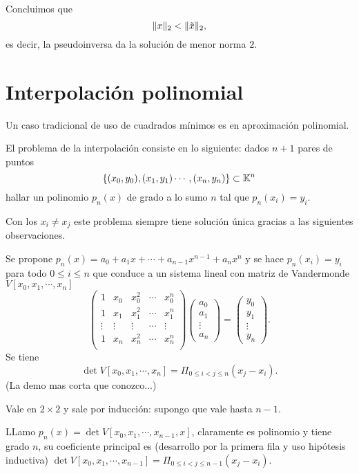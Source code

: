Concluimos que
$$
\|\xb\|_2<\|\tilde\xb\|_2,
$$
es decir, la pseudoinversa da la solución de menor norma $2$.



\section{Interpolación polinomial}
Un caso tradicional de uso de cuadrados mínimos es en aproximación polinomial.

El problema de la interpolación consiste en lo siguiente: dados $n+1$ pares de puntos
$$\{(x_{0},y_{0}),(x_{1},y_{1})\cdots ,(x_{n},y_{n})\}\subset \mathbb K^{n}$$
hallar un polinomio $p_{n}(x)$ de grado a lo sumo $n$ tal que $p_{n}(x_{i})=y_{i}$.


Con los $x_{i}\neq x_{j}$ este problema siempre tiene solución única gracias a las siguientes observaciones.



 Se propone $p_{n}(x)=a_{0}+ a_{1}x+\cdots +a_{n-1}x^{n-1} +a_{n}x^{n}$ y se hace $p_{n}(x_{i})=y_{i}$ para todo $0\le i\le n$ que conduce a un sistema lineal con matriz de Vandermonde $V[x_0,x_1,\cdots,x_n]$
 $$
 \begin{pmatrix}
 1&x_{0}&x_{0}^{2}&\cdots &x_{0}^{n}\\
 1&x_{1}&x_{1}^{2}&\cdots &x_{1}^{n}\\
 \vdots&\vdots&\vdots&\cdots&\vdots\\
 1&x_{n}&x_{n}^{2}&\cdots &x_{n}^{n}\\
 \end{pmatrix}
 \begin{pmatrix}
 a_{0}\\
 a_{1}\\
 \vdots\\
 a_{n}
 \end{pmatrix}=
 \begin{pmatrix}
y_{0}\\
 y_{1}\\
 \vdots\\
 y_{n}
 \end{pmatrix}.
 $$
 Se tiene
 $$
 \det V[x_0,x_1,\cdots,x_n]=\Pi_{0\le i<j\le n}(x_j-x_i).
 $$
 (La demo mas corta que conozco...)

 Vale en $2\times 2$ y sale por inducción: supongo que vale hasta $n-1$.

 LLamo
 $p_n(x)=\det V[x_0,x_1,\cdots,x_{n-1},x]$, claramente es polinomio y tiene grado $n$, su coeficiente principal es (desarrollo por la primera fila y uso hipótesis inductiva) $\det V[x_0,x_1,\cdots,x_{n-1}]=\Pi_{0\le i<j\le n-1}(x_j-x_i)$.

